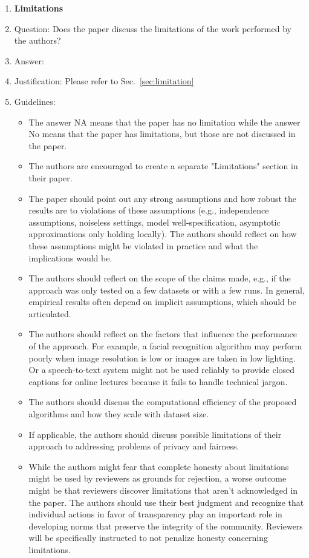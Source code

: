 \documentclass{article}
\begin{document}
\begin{enumerate}
\item {\bf Limitations}
    \item[] Question: Does the paper discuss the limitations of the work performed by the authors?
    \item[] Answer: \answerYes{} %
    \item[] Justification: Please refer to Sec.~\ref{sec:limitation}
    \item[] Guidelines:
    \begin{itemize}
        \item The answer NA means that the paper has no limitation while the answer No means that the paper has limitations, but those are not discussed in the paper. 
        \item The authors are encouraged to create a separate "Limitations" section in their paper.
        \item The paper should point out any strong assumptions and how robust the results are to violations of these assumptions (e.g., independence assumptions, noiseless settings, model well-specification, asymptotic approximations only holding locally). The authors should reflect on how these assumptions might be violated in practice and what the implications would be.
        \item The authors should reflect on the scope of the claims made, e.g., if the approach was only tested on a few datasets or with a few runs. In general, empirical results often depend on implicit assumptions, which should be articulated.
        \item The authors should reflect on the factors that influence the performance of the approach. For example, a facial recognition algorithm may perform poorly when image resolution is low or images are taken in low lighting. Or a speech-to-text system might not be used reliably to provide closed captions for online lectures because it fails to handle technical jargon.
        \item The authors should discuss the computational efficiency of the proposed algorithms and how they scale with dataset size.
        \item If applicable, the authors should discuss possible limitations of their approach to addressing problems of privacy and fairness.
        \item While the authors might fear that complete honesty about limitations might be used by reviewers as grounds for rejection, a worse outcome might be that reviewers discover limitations that aren't acknowledged in the paper. The authors should use their best judgment and recognize that individual actions in favor of transparency play an important role in developing norms that preserve the integrity of the community. Reviewers will be specifically instructed to not penalize honesty concerning limitations.
    \end{itemize}


\end{enumerate}
\end{document}
